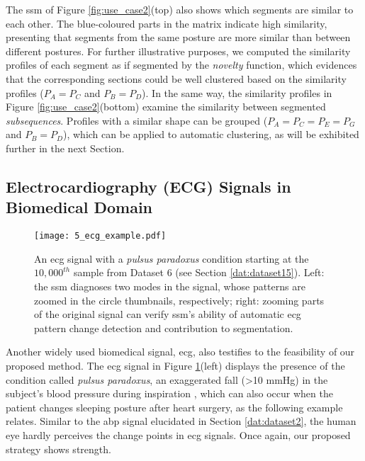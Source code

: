 The \gls{ssm} of Figure \ref{fig:use_case2}(top) also shows which segments are similar to each other. The blue-coloured parts in the matrix indicate high similarity, presenting that segments from the same posture are more similar than between different postures. For further illustrative purposes, we computed the similarity profiles of each segment as if segmented by the \textit{novelty} function, which evidences that the corresponding sections could be well clustered based on the similarity profiles ($P_A = P_C$ and $P_B=P_D$). In the same way, the similarity profiles in Figure \ref{fig:use_case2}(bottom) examine the similarity between segmented \textit{subsequences}. Profiles with a similar shape can be grouped ($P_A=P_C=P_E=P_G$ and $P_B=P_D$), which can be applied to automatic clustering, as will be exhibited further in the next Section.

\subsection{Electrocardiography (ECG) Signals in Biomedical Domain}
\label{sec:ecg_example}

\begin{figure}
    \centering
    \texttt{[image: 5\_ecg\_example.pdf]}
    \caption{An \gls{ecg} signal with a \textit{pulsus paradoxus} condition starting at the $10,000^{th}$ sample from Dataset 6 (see Section \ref{dat:dataset15}). Left: the \gls{ssm} diagnoses two modes in the signal, whose patterns are zoomed in the circle thumbnails, respectively; right: zooming parts of the original signal can verify \gls{ssm}'s ability of automatic \gls{ecg} pattern change detection and contribution to segmentation.}
    \label{fig:use_case3}
\end{figure}

Another widely used biomedical signal, \gls{ecg}, also testifies to the feasibility of our proposed method. The \gls{ecg} signal in Figure \ref{fig:use_case3}(left) displays the presence of the condition called \textit{pulsus paradoxus}, an exaggerated fall (>10 mmHg) in the subject's blood pressure during inspiration \cite{pulsusparadoxus2}, which can also occur when the patient changes sleeping posture after heart surgery\cite{eamonn_segmentation}, as the following example relates. Similar to the \gls{abp} signal elucidated in Section \ref{dat:dataset2}, the human eye hardly perceives the change points in \gls{ecg} signals. Once again, our proposed strategy shows strength.

